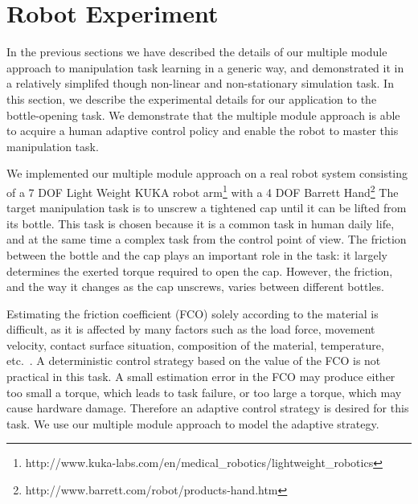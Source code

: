 \section{Robot Experiment}
\label{sec:exp}

In the previous sections we have described the details of our multiple
module approach to manipulation task learning in a generic way, and
demonstrated it in a relatively simplifed though non-linear and
non-stationary simulation task. In this section,
we describe the experimental details for our application to the
bottle-opening task.  We demonstrate that the multiple module approach
is able to acquire a human adaptive control policy and enable the robot
to master this manipulation task.

We implemented our multiple module approach on a real robot system
consisting of a 7 DOF Light Weight KUKA robot
arm\footnote{http://www.kuka-labs.com/en/medical\_robotics/lightweight\_robotics}
with a 4 DOF Barrett Hand\footnote{http://www.barrett.com/robot/products-hand.htm}
The target manipulation 
task is to unscrew a tightened cap until it can be lifted from
its bottle. This task is chosen because it is a common task in human daily
life, and at the same time a
complex task from the control point of view. The friction between the
bottle and the cap plays an important role in the task: it largely
determines the exerted torque required to open the cap. However, the
friction, and the way it changes as the cap unscrews, varies
between different bottles.

Estimating the friction coefficient (FCO) solely according to the
material is difficult, as it is affected by many factors such as the
load force, movement velocity, contact surface situation, composition
of the material, temperature,
etc.~\citep{gustafssoninvestigation}. A deterministic control strategy
based on the value of the FCO is not practical in this task. A small
estimation error in the FCO may produce either too small a torque,
which leads to task failure, or too large a torque, which may cause
hardware damage. Therefore an adaptive control strategy is desired for
this
task. %
We use our multiple module approach to model the adaptive strategy.


